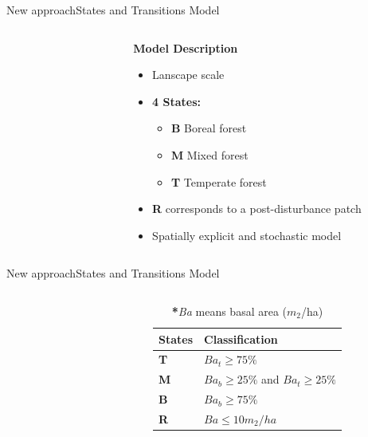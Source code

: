 \documentclass[10pt,aspectratio=149]{beamer}
\begin{document}
\begin{frame}{New approach}{States and Transitions Model}

\begin{columns}[t]
	\begin{column}[t]{.40\paperwidth}
		\begin{figure}
			\small{}
		\end{figure}
	\end{column}
	\begin{column}[t]{.50\paperwidth}
	\textbf{Model Description}
		\begin{itemize}
			\item Lanscape scale
			\item \textbf{4 States:}
			\begin{itemize}
				\item \textbf{B} Boreal forest
				\item \textbf{M} Mixed forest
				\item \textbf{T} Temperate forest
			\end{itemize}
			\item \textbf{R} corresponds to a post-disturbance patch
			\item Spatially explicit and stochastic model
		\end{itemize}
	\end{column}
\end{columns}
\end{frame}


\begin{frame}{New approach}{States and Transitions Model}

\begin{columns}[t]
	\begin{column}[t]{.40\paperwidth}
		\begin{figure}
			\small{}
		\end{figure}
	\end{column}
	\begin{column}[t]{.50\paperwidth}
	\begin{table}
		\begin{tabular}{|l|l|}
			\hline
			\textbf{States}  & \textbf{Classification}\\
			\hline
			\textbf{T} & $Ba_t \geq 75\%$    \\
			\textbf{M} & $Ba_b \geq 25\%$ and $Ba_t \geq 25\%$ \\
			\textbf{B} & $Ba_b \geq 75\%$   \\
			\textbf{R} & $Ba  \leq 10m_2/ha $ \\ 			\hline 
		\end{tabular}
			\caption{ \textbf{*}\textit{Ba} means basal area ($m_{2}$/ha)}
		\end{table}
	\end{column}
\end{columns}

\end{frame}
\end{document}
